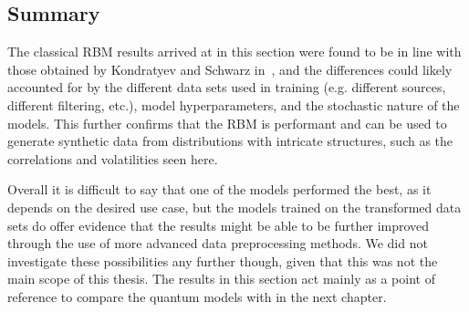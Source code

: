 \subsection{Summary}
The classical RBM results arrived at in this section were found to be in line with those obtained by Kondratyev and Schwarz in~\cite{kondratyev_2019}, and the differences could likely accounted for by the different data sets used in training (e.g. different sources, different filtering, etc.), model hyperparameters, and the stochastic nature of the models.
This further confirms that the RBM is performant and can be used to generate synthetic data from distributions with intricate structures, such as the correlations and volatilities seen here.

Overall it is difficult to say that one of the models performed the best, as it depends on the desired use case, but the models trained on the transformed data sets do offer evidence that the results might be able to be further improved through the use of more advanced data preprocessing methods.
We did not investigate these possibilities any further though, given that this was not the main scope of this thesis.
The results in this section act mainly as a point of reference to compare the quantum models with in the next chapter.
